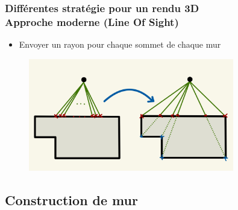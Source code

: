 \documentclass{beamer}
\begin{document}
\begin{frame}
    \frametitle{Différentes stratégie pour un rendu 3D \\
                \small Approche moderne (Line Of Sight)}    
                
    
    \begin{block}{}
        \begin{itemize} 
            \item Envoyer un rayon pour chaque sommet de chaque mur
        \end{itemize}

    \end{block}    


    \begin{figure}
        \centering
        \includegraphics[width=0.8\textwidth]{images/comparaison-deux-methodes.jpeg}
    \end{figure}
\end{frame}

\subsection{Construction de mur}
\end{document}
